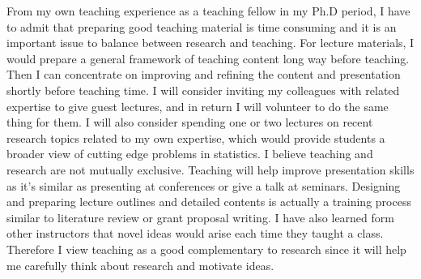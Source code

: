 \documentclass[12pt]{amsart} \usepackage{amssymb}
\begin{document}
From my own teaching experience as a teaching fellow in my Ph.D period,
I have to admit that preparing good teaching material is time consuming and it is an important issue to balance between research and teaching.
For lecture materials, I would prepare a general framework of teaching content long way before teaching.
Then I can concentrate on improving and refining the content and presentation shortly before teaching time.
I will consider inviting my colleagues with related expertise to give guest lectures, 
and in return I will volunteer to do the same thing for them.
I will also consider spending one or two lectures on recent research topics related to my own expertise, 
which would provide students a broader view of cutting edge problems in statistics.
I believe teaching and research are not  mutually exclusive.
Teaching will help improve presentation skills as it's similar as presenting at conferences or give a talk at seminars.
Designing and preparing lecture outlines and detailed contents is actually a training process similar to literature review or grant proposal writing.
I have also learned form other instructors that novel ideas would arise each time they taught a class.
Therefore I view teaching as a good complementary to research since it will help me carefully think about research and motivate ideas.
\end{document}
